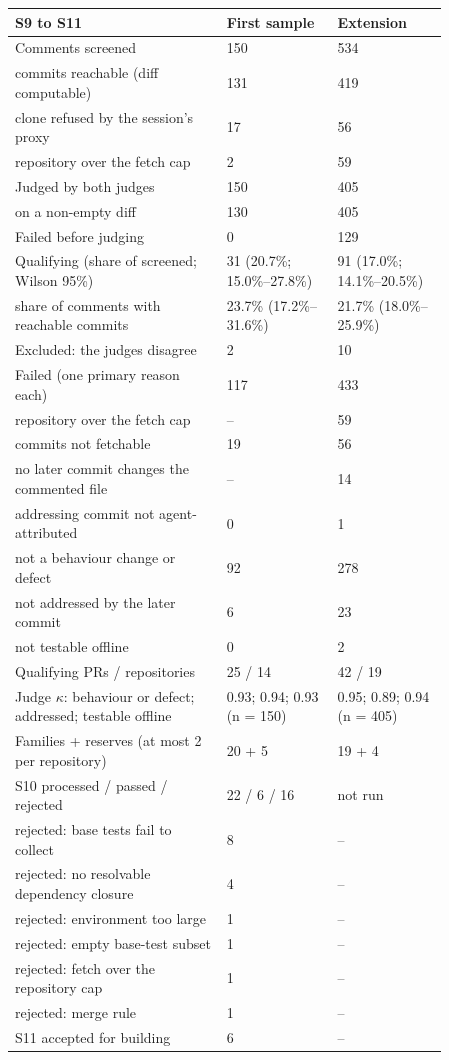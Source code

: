 \begin{table}[t]
\medskip
\begin{tabular}{p{0.42\linewidth}p{0.22\linewidth}p{0.22\linewidth}}\toprule S9 to S11 & First sample & Extension \\\midrule
Comments screened & 150 & 534 \\
\quad commits reachable (diff computable) & 131 & 419 \\
\quad clone refused by the session's proxy & 17 & 56 \\
\quad repository over the fetch cap & 2 & 59 \\
Judged by both judges & 150 & 405 \\
\quad on a non-empty diff & 130 & 405 \\
Failed before judging & 0 & 129 \\
Qualifying (share of screened; Wilson 95\%) & 31 (20.7\%; 15.0\%--27.8\%) & 91 (17.0\%; 14.1\%--20.5\%) \\
\quad share of comments with reachable commits & 23.7\% (17.2\%--31.6\%) & 21.7\% (18.0\%--25.9\%) \\
Excluded: the judges disagree & 2 & 10 \\
Failed (one primary reason each) & 117 & 433 \\
\quad repository over the fetch cap & -- & 59 \\
\quad commits not fetchable & 19 & 56 \\
\quad no later commit changes the commented file & -- & 14 \\
\quad addressing commit not agent-attributed & 0 & 1 \\
\quad not a behaviour change or defect & 92 & 278 \\
\quad not addressed by the later commit & 6 & 23 \\
\quad not testable offline & 0 & 2 \\
Qualifying PRs / repositories & 25 / 14 & 42 / 19 \\
Judge $\kappa$: behaviour or defect; addressed; testable offline & 0.93; 0.94; 0.93 (n = 150) & 0.95; 0.89; 0.94 (n = 405) \\\midrule
Families + reserves (at most 2 per repository) & 20 + 5 & 19 + 4 \\
S10 processed / passed / rejected & 22 / 6 / 16 & not run \\
\quad rejected: base tests fail to collect & 8 & -- \\
\quad rejected: no resolvable dependency closure & 4 & -- \\
\quad rejected: environment too large & 1 & -- \\
\quad rejected: empty base-test subset & 1 & -- \\
\quad rejected: fetch over the repository cap & 1 & -- \\
\quad rejected: merge rule & 1 & -- \\
S11 accepted for building & 6 & -- \\
\bottomrule\end{tabular}\end{table}
